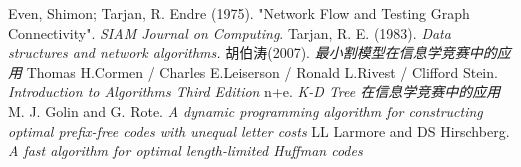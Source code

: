 \begin{thebibliography}{999}
	 Even, Shimon; Tarjan, R. Endre (1975).
	"Network Flow and Testing Graph Connectivity".
    \emph{SIAM Journal on Computing}.
     Tarjan, R. E. (1983).
    \emph{Data structures and network algorithms.}
    胡伯涛(2007). \emph{最小割模型在信息学竞赛中的应用}
      Thomas H.Cormen / Charles E.Leiserson /
     Ronald L.Rivest / Clifford Stein.
     \emph{Introduction to Algorithms Third Edition}
    n+e. \emph{K-D Tree 在信息学竞赛中的应用}
    M. J. Golin and G. Rote.
    \emph{A dynamic programming algorithm for constructing optimal
    prefix-free codes with unequal letter costs}
    LL Larmore and DS Hirschberg.
    \emph{A fast algorithm for optimal length-limited Huffman codes}
\end{thebibliography}
